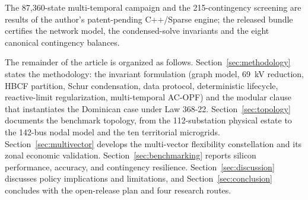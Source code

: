 The 87,360-state multi-temporal campaign and the 215-contingency screening are results of the author's patent-pending C++/Sparse engine; the released bundle certifies the network model, the condensed-solve invariants and the eight canonical contingency balances.

The remainder of the article is organized as follows. Section~\ref{sec:methodology} states the methodology: the invariant formulation (graph model, 69~kV reduction, HBCF partition, Schur condensation, data protocol, deterministic lifecycle, reactive-limit regularization, multi-temporal AC-OPF) and the modular clause that instantiates the Dominican case under Law 368-22. Section~\ref{sec:topology} documents the benchmark topology, from the 112-substation physical estate to the 142-bus nodal model and the ten territorial microgrids. Section~\ref{sec:multivector} develops the multi-vector flexibility constellation and its zonal economic validation. Section~\ref{sec:benchmarking} reports silicon performance, accuracy, and contingency resilience. Section~\ref{sec:discussion} discusses policy implications and limitations, and Section~\ref{sec:conclusion} concludes with the open-release plan and four research routes.
